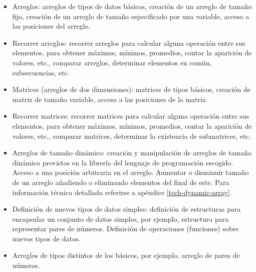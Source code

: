 
\begin{itemize}
\item[\basic{}] Arreglos: arreglos de tipos de datos básicos, creación de un
  arreglo de tamaño fijo, creación de un arreglo de tamaño especificado por una
  variable, acceso a las posiciones del arreglo.

\item[\basic{}] Recorrer arreglos: recorrer arreglos para calcular alguna operación entre
  sus elementos, para obtener máximos, mínimos, promedios, contar la aparición
  de valores, etc., comparar arreglos, determinar elementos en común,
  subsecuencias, etc.

\item[\basic{}] Matrices (arreglos de dos dimensiones): matrices de tipos
  básicos, creación de matriz de tamaño variable, acceso a las posiciones de la
  matriz.

\item[\basic{}] Recorrer matrices: recorrer matrices para calcular alguna operación entre
  sus elementos, para obtener máximos, mínimos, promedios, contar la aparición
  de valores, etc., comparar matrices, determinar la existencia de submatrices,
  etc.

\item[\basic{}] Arreglos de tamaño dinámico: creación y manipulación de arreglos
  de tamaño dinámico provistos en la librería del lenguaje de programación escogido.
  Acceso a una posición arbitraria en el arreglo.
  Aumentar o disminuir tamaño de un arreglo añadiendo o eliminando elementos del
  final de este.
  Para información técnica detallada referirse a apéndice \ref{tech-dynamic-array}.

\item[\advanced{}] Definición de nuevos tipos de datos simples:
  definición de estructuras para encapsular un conjunto de datos simples, por
  ejemplo, estructura para representar pares de números.
  Definición de operaciones (funciones) sobre nuevos tipos de datos.

\item[\advanced{}] Arreglos de tipos distintos de los básicos, por ejemplo,
  arreglo de pares de números.
\end{itemize}

